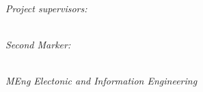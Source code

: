 \begin{titlepage}
\begin{center}
\begin{minipage}[t]{0.4\hsize}
\end{minipage}~\begin{minipage}[t]{0.4\hsize}
    \begin{flushright} \Large
    \textit{Project supervisors:}\\
    \supervisor \\%
    \supervisorassistant
    \end{flushright}
    \vspace{1cm}




    \begin{flushright} \Large
    \textit{Second Marker:}\\
    \secondmarker\\
    \end{flushright}
\end{minipage}
\end{center}

\vspace{7cm}
\begin{flushleft} \Large
\centering
\textit{MEng Electonic and Information Engineering}
\end{flushleft}
\Large
\makeatletter
\centering
\@date 

\vfill %



\makeatother


\end{titlepage}

